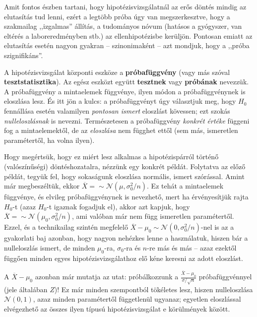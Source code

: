 \documentclass[
]{book}
\begin{document}
Amit fontos észben tartani, hogy hipotézisvizsgálatnál az erős döntés mindig az elutasítás tud lenni, ezért a legtöbb próba úgy van megszerkesztve, hogy a szakmailag ,,izgalmas'' állítás, a tudományos nóvum (hatásos a gyógyszer, van eltérés a laboreredményben stb.) az ellenhipotézisbe kerüljön. Pontosan emiatt az elutasítás esetén nagyon gyakran -- szinonimaként -- azt mondjuk, hogy a ,,próba szignifikáns''.

A hipotézisvizsgálat központi eszköze a \textbf{próbafüggvény} (vagy más szóval \textbf{tesztstatisztika}). Az egész eszközt együtt \textbf{tesztnek} vagy \textbf{próbának} nevezzük. A próbafüggvény a mintaelemek függvénye, ilyen módon a próbafüggvénynek is eloszlása lesz. És itt jön a kulcs: a próbafüggvényt úgy választjuk meg, hogy \(H_0\) fennállása esetén valamilyen \emph{pontosan ismert} eloszlást kövessen; ezt szokás \emph{nulleloszlásnak} is nevezni. Természetesen a próbafüggvény \emph{konkrét értéke} függeni fog a mintaelemektől, de az \emph{eloszlása} nem függhet ettől (sem más, ismeretlen paramétertől, ha volna ilyen).

Hogy megértsük, hogy ez miért lesz alkalmas a hipotézispárról történő (valószínűségi) döntéshozatalra, nézzünk egy konkrét példát. Folytatva az előző példát, tegyük fel, hogy sokaságunk eloszlása normális, ismert szórással. Amint már megbeszéltük, ekkor \(\overline{X}= \sim \mathcal{N}\left(\mu,\sigma_0^2/n\right)\). Ez tehát a mintaelemek függvénye, és elvileg próbafüggvénynek is nevezhető, mert ha érvényesítjük rajta \(H_0\)-t (azaz \(H_0\)-t igaznak fogadjuk el), akkor azt kapjuk, hogy \(\overline{X}= \sim \mathcal{N}\left(\mu_0,\sigma_0^2/n\right)\), ami valóban már nem függ ismeretlen paramétertől. Ezzel, és a technikailag szintén megfelelő \(\overline{X}-\mu_0\sim \mathcal{N}\left(0,\sigma_0^2/n\right)\)-nel is az a gyakorlati baj azonban, hogy nagyon nehézkes lenne a használatuk, hiszen bár a nulleloszlás ismert, de minden \(\mu_0\)-ra, \(\sigma_0\)-ra és \(n\)-re más és más -- azaz ezektől függően minden egyes hipotézisvizsgálathoz elő kéne keresni az adott eloszlást.

A \(\overline{X}-\mu_0\) azonban már mutatja az utat: próbálkozzunk a \(\frac{\overline{X}-\mu_0}{\sigma/\sqrt{n}}\) próbafüggvénnyel (jele általában \(Z\))! Ez már minden szempontból tökéletes lesz, hiszen nulleloszlása \(\mathcal{N}\left(0,1\right)\), azaz minden paramétertől függetlenül ugyanaz; egyetlen eloszlással elvégezhető az összes ilyen típusú hipotézisvizsgálat e körülmények között.
\end{document}
